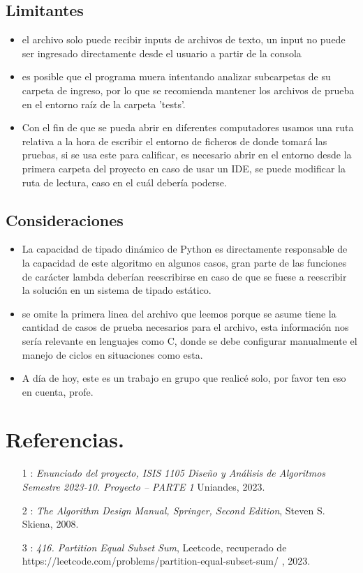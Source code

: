 \documentclass[a4paper]{article}
\begin{document}
\subsection{Limitantes}
    \begin{itemize}
        \item el archivo solo puede recibir inputs de archivos de texto, un input no
        puede ser ingresado directamente desde el usuario a partir de la consola
        \item es posible que el programa muera intentando analizar subcarpetas de su carpeta
        de ingreso, por lo que se recomienda mantener los archivos de prueba en el entorno
        raíz de la carpeta 'tests'.
        \item Con el fin de que se pueda abrir en diferentes computadores usamos una ruta relativa
        a la hora de escribir el entorno de ficheros de donde tomará las pruebas, si se usa este 
        para calificar, es necesario abrir en el entorno desde la primera carpeta del proyecto en
        caso de usar un IDE, se puede modificar la ruta de lectura, caso en el cuál debería poderse. 
    \end{itemize}
\subsection{Consideraciones}
\begin{itemize}
    \item La capacidad de tipado dinámico de Python es directamente responsable de
    la capacidad de este algoritmo en algunos casos, gran parte de las funciones
    de carácter lambda deberían reescribirse en caso de que se fuese a reescribir la solución
    en un sistema de tipado estático.
    \item se omite la primera linea del archivo que leemos porque se asume tiene la
    cantidad de casos de prueba necesarios para el archivo, esta información nos
    sería relevante en lenguajes como C, donde se debe configurar manualmente el manejo
    de ciclos en situaciones como esta.
    \item A día de hoy, este es un trabajo en grupo que realicé solo, por favor ten eso
    en cuenta, profe.
\end{itemize}
\section{Referencias.}
\begin{itemize}
    \item [1]: \textit{Enunciado del proyecto, ISIS 1105 Diseño y Análisis de Algoritmos
    Semestre 2023-10. Proyecto – PARTE 1} Uniandes, 2023.
    \item [2]: \textit{The Algorithm Design Manual, Springer, Second Edition}, Steven S. Skiena, 2008.
    \item [3]: \textit{416. Partition Equal Subset Sum}, Leetcode, recuperado de 
    https://leetcode.com/problems/partition-equal-subset-sum/ , 2023.
\end{itemize}
\end{document}
